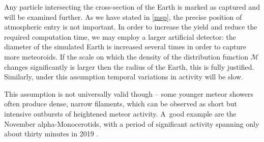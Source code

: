 %
%
%
%


        Any particle intersecting the cross-section of the Earth is marked as captured and will be examined further.
        As we have stated in \cref{msp}, the precise position of atmospheric entry is not important.
        In order to increase the yield and reduce the required computation time, we may employ a larger artificial detector:
        the diameter of the simulated Earth is increased several times in order to capture more meteoroids.
        If the scale on which the density of the distribution function $\mathcal{M}$ changes significantly
        is larger then the radius of the Earth, this is fully justified.
        Similarly, under this assumption temporal variations in activity will be slow.

        This assumption is not universally valid though -- some younger meteor showers often produce dense, narrow filaments,
        which can be observed as short but intensive outbursts of heightened meteor activity.
        A~good example are the November alpha-Monocerotids, with a period of significant
        activity spanning only about thirty minutes in 2019 \citep{CBET4692}.

